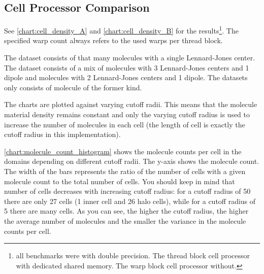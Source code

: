 \subsection{Cell Processor Comparison}
\label{subsec:dataset_info}
See \autoref{chart:cell_density_A} and \autoref{chart:cell_density_B} for the results\footnote{all benchmarks were with double precision. The thread block cell processor with dedicated shared memory. The warp block cell processor without.}. The specified warp count always refers to the used warps per thread block.

The  dataset consists of that many molecules with a single Lennard-Jones center.
The  dataset consists of a mix of molecules with 3 Lennard-Jones centers and 1 dipole and molecules with 2 Lennard-Jones centers and 1 dipole.
The  datasets only consists of molecule of the former kind.

The charts are plotted against varying cutoff radii. This means that the molecule material density remains constant and only the varying cutoff radius is used to increase the number of molecules in each cell (the length of cell is exactly the cutoff radius in this implementation).

\autoref{chart:molecule_count_histogram} shows the molecule counts per cell in the domains depending on different cutoff radii.
The y-axis shows the molecule count. The width of the bars represents the ratio of the number of cells with a given molecule count to the total number of cells.
You should keep in mind that number of cells decreases with increasing cutoff radius: for a cutoff radius of 50 there are only 27 cells (1 inner cell and 26 halo cells), while for a cutoff radius of 5 there are many cells.
As you can see, the higher the cutoff radius, the higher the average number of molecules and the smaller the variance in the molecule counts per cell.

